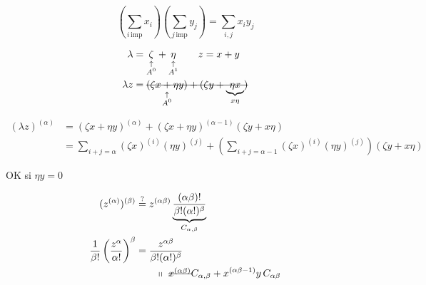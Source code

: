 

\[
 \left(\sum_{i\,\mathrm{imp}}x_i\right)\left(\sum_{j\,\mathrm{imp}}y_j\right)=\sum_{i,j}x_i y_j
\]

\[
\begin{aligned}
 \lambda&=\underset{\substack{\uparrow\\A^0}}{\zeta}+\underset{\substack{\uparrow\\A^1}}{\eta}\qquad z=x+y\\
 \lambda z&=\deleted{\underset{\substack{\uparrow\\ A^0}}{(\zeta x+\eta y)}+(\zeta y+\underbrace{\eta x}_{x\eta})}
\end{aligned}
\]

\[
\begin{aligned}
 (\lambda z)^{(\alpha)}&=(\zeta x+\eta y)^{(\alpha)}+(\zeta x+\eta y)^{(\alpha-1)}(\zeta y+x\eta)\\
 &=\sum_{i+j=\alpha}(\zeta x)^{(i)}(\eta y)^{(j)}
 +\left(\sum_{i+j=\alpha-1}(\zeta x)^{(i)}(\eta y)^{(j)}\right)(\zeta y+x\eta)
\end{aligned}
\]

\deleted{\[
\begin{aligned}
 \lambda^\alpha z^{(\alpha)}&=(\zeta^\alpha+\alpha\zeta^{\alpha-1}\eta)(x^{(\alpha)}+x^{(\alpha-1)}y)\\
 &=(\zeta^\alpha x^{(\alpha)}+\alpha\zeta^{\deleted{\unsure{\alpha-1}}\alpha-1}x^{(\alpha-1)}\eta y)
 +(\zeta^\alpha x^{(\alpha-1)}y+\overbrace{\alpha\zeta^{\alpha-1}x^{(\alpha)}\eta}^{\alpha!\,\zeta^{(\alpha-1)}x^{(\alpha)}=x^\alpha\zeta^{(\alpha-1)}})\\
 &=((\zeta x)^{(\alpha)}+\alpha(\zeta x)^{(\alpha-1)}(\eta y))
 +(\zeta(\zeta x)^{\alpha-1}y+x(x\zeta)^{(\alpha-1)}\eta)
\end{aligned}
\]}

OK si \quad $\eta y=0$

\[
\begin{aligned}
 (z^{(\alpha)})^{(\beta)}&\overset{?}{=}z^{(\alpha\beta)}
 \underbrace{\frac{(\alpha\beta)!}{\beta!(\alpha!)^\beta}}_{C_{\alpha,\beta}}\\
 \frac{1}{\beta!}\left(\frac{z^\alpha}{\alpha!}\right)^\beta&=\frac{z^{\alpha\beta}}{\beta!(\alpha!)^\beta}
\\ &\qquad\shortparallel\ \deleted{x^{(\alpha\beta)}}C_{\alpha,\beta}+x^{(\alpha\beta-1)}y\, C_{\alpha\beta}
\end{aligned}
\]

